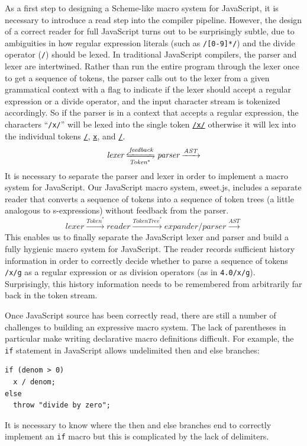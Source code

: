 \documentclass[preprint,10pt]{sigplanconf}
\begin{document}
As a first step to designing a Scheme-like macro system for
JavaScript, it is necessary to introduce a read step into the compiler
pipeline. However, the design of a correct reader for full JavaScript
turns out to be surprisingly subtle, due to ambiguities in how regular
expression literals (such as \verb!/[0-9]*/!) and the divide
operator (\verb!/!) should be lexed. In traditional JavaScript
compilers, the parser and lexer are intertwined. Rather than run the
entire program through the lexer once to get a sequence of tokens, the
parser calls out to the lexer from a given grammatical context with a
flag to indicate if the lexer should accept a regular expression or
a divide operator, and the input character stream is tokenized accordingly.
So if the parser is in a context that accepts a regular expression, the characters ``\verb!/x/!'' will be lexed into the single token \underline{\verb!/x/!} otherwise it will lex into the individual tokens \underline{\verb!/!}, \underline{\verb!x!}, and \underline{\verb!/!}.
\[
\textit{lexer} \xleftrightharpoons[\textit{Token}^{*}]{\textit{feedback}}
\textit{parser} \xrightarrow{\textit{AST}}
\]
It is necessary to separate the parser and lexer in order to implement
a macro system for JavaScript. Our JavaScript macro system,
sweet.js, includes a separate
reader that converts a sequence of tokens into a sequence of token
trees (a little analogous to s-expressions) without feedback from the
parser.
\[
\textit{lexer} \xrightarrow{\textit{Token}^{*}}
\textit{reader} \xrightarrow{\textit{TokenTree}^{*}}
\textit{expander/parser} \xrightarrow{\textit{AST}}
\]
This enables us to finally separate the JavaScript lexer and parser
and build a fully hygienic macro system for JavaScript.
The reader records sufficient history information in order to 
correctly decide whether to parse a sequence of tokens
\verb!/x/g! as a regular expression or as division operators 
(as in \verb!4.0/x/g!). Surprisingly, this history
information needs to be remembered from arbitrarily far back in the
token stream.


Once JavaScript source has been correctly read, there are still a
number of challenges to building an expressive macro system. The lack
of parentheses in particular make writing declarative macro
definitions difficult. For example, the \verb!if! statement in
JavaScript allows undelimited then and else branches:
\begin{lstlisting}
if (denom > 0)
  x / denom;
else
  throw "divide by zero";
\end{lstlisting}
It is necessary to know where the then and else branches end to
correctly implement an \verb!if! macro but this is complicated by
the lack of delimiters. 
\end{document}
